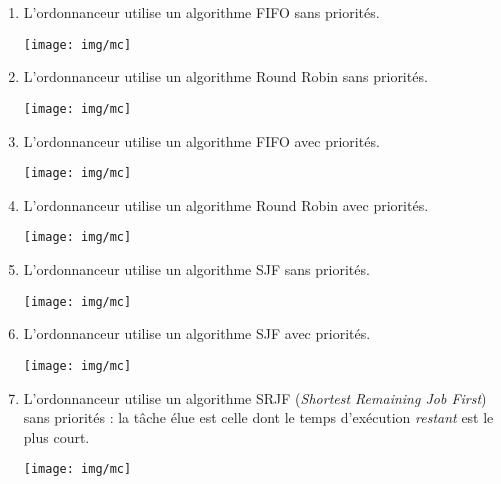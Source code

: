 \documentclass[a4paper,12pt,french]{article}
\begin{document}
\begin{enumerate}
	\item 	L'ordonnanceur utilise un algorithme FIFO sans priorités.
    \begin{center}
    \texttt{[image: img/mc]}\\
    \end{center}
	\item 	L'ordonnanceur utilise un algorithme Round Robin sans priorités.
        \begin{center}
        \texttt{[image: img/mc]}\\
        \end{center}
        
        \newpage
        
    \item L'ordonnanceur utilise un algorithme FIFO avec priorités.
        \begin{center}
        \texttt{[image: img/mc]}\\
        \end{center}	
    \item L'ordonnanceur utilise un algorithme Round Robin avec priorités.
        \begin{center}
        \texttt{[image: img/mc]}\\
        \end{center}
        
    \item L'ordonnanceur utilise un algorithme SJF sans priorités.
        \begin{center}
        \texttt{[image: img/mc]}\\
        \end{center}
    
    \item L'ordonnanceur utilise un algorithme SJF avec priorités.
            \begin{center}
            \texttt{[image: img/mc]}\\
            \end{center}
        
     \item L'ordonnanceur utilise un algorithme SRJF (\textit{Shortest Remaining Job First}) sans priorités : la tâche élue est celle dont le temps d'exécution \textit{restant} est le plus court.
                 \begin{center}
                 \texttt{[image: img/mc]}\\
                 \end{center}
\end{enumerate}
\end{document}
